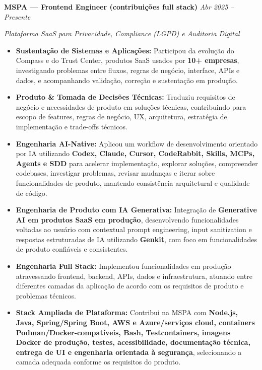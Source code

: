 \documentclass[10pt,a4paper]{article}
\begin{document}
\noindent
\textbf{MSPA — Frontend Engineer (contribuições full stack)}
\hfill
\textit{Abr 2025 -- Presente}

\textit{Plataforma SaaS para Privacidade, Compliance (LGPD) e Auditoria Digital}

\begin{itemize}

    \item
    \textbf{Sustentação de Sistemas e Aplicações:}
    Participou da evolução do Compass e do Trust Center, produtos
    SaaS usados por \textbf{10+ empresas}, investigando problemas
    entre fluxos, regras de negócio, interface, APIs e dados, e
    acompanhando validação, correção e sustentação em produção.

    \item
    \textbf{Produto \& Tomada de Decisões Técnicas:}
    Traduziu requisitos de negócio e necessidades de produto em
    soluções técnicas, contribuindo para escopo de features,
    regras de negócio, UX, arquitetura, estratégia de
    implementação e trade-offs técnicos.

    \item
    \textbf{Engenharia AI-Native:}
    Aplicou um workflow de desenvolvimento orientado por IA
    utilizando \textbf{Codex, Claude, Cursor, CodeRabbit, Skills,
    MCPs, Agents e SDD} para acelerar implementação, explorar
    soluções, compreender codebases, investigar problemas,
    revisar mudanças e iterar sobre funcionalidades de produto,
    mantendo consistência arquitetural e qualidade de código.

    \item
    \textbf{Engenharia de Produto com IA Generativa:}
    Integração de \textbf{Generative AI em produtos SaaS em
    produção}, desenvolvendo funcionalidades voltadas ao usuário
    com contextual prompt engineering, input sanitization e
    respostas estruturadas de IA utilizando \textbf{Genkit},
    com foco em funcionalidades de produto confiáveis e
    consistentes.

    \item
    \textbf{Engenharia Full Stack:}
    Implementou funcionalidades em produção atravessando
    frontend, backend, APIs, dados e infraestrutura, atuando
    entre diferentes camadas da aplicação de acordo com os
    requisitos de produto e problemas técnicos.

    \item
    \textbf{Stack Ampliada de Plataforma:}
    Contribui na MSPA com \textbf{Node.js, Java, Spring/Spring Boot,
    AWS e Azure/serviços cloud, containers Podman/Docker-compatíveis,
    Bash, Testcontainers, imagens Docker de produção, testes, acessibilidade,
    documentação técnica, entrega de UI e engenharia orientada à segurança},
    selecionando a camada adequada conforme os requisitos do produto.


\end{itemize}
\end{document}
